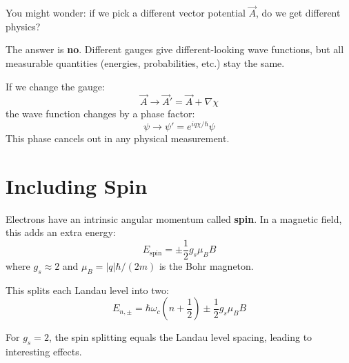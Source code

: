 \documentclass[11pt,a4paper]{article}
\let\oldsection\section
\renewcommand{\section}{\needspace{5\baselineskip}\oldsection}
\theoremstyle{definition}
\theoremstyle{remark}
\begin{document}
You might wonder: if we pick a different vector potential $\vec{A}$, do we get different physics?

The answer is \textbf{no}. Different gauges give different-looking wave functions, but all measurable quantities (energies, probabilities, etc.) stay the same.

If we change the gauge:
\begin{equation}
    \vec{A} \to \vec{A}' = \vec{A} + \nabla\chi
\end{equation}
the wave function changes by a phase factor:
\begin{equation}
    \psi \to \psi' = e^{iq\chi/\hbar} \psi
\end{equation}
This phase cancels out in any physical measurement.
\\
\section{Including Spin}

Electrons have an intrinsic angular momentum called \textbf{spin}. In a magnetic field, this adds an extra energy:
\begin{equation}
    E_{\text{spin}} = \pm \frac{1}{2}g_s\mu_B B
\end{equation}
where $g_s \approx 2$ and $\mu_B = |q|\hbar/(2m)$ is the Bohr magneton.

This splits each Landau level into two:
\begin{equation}
    E_{n, \pm} = \hbar\omega_c\left(n + \frac{1}{2}\right) \pm \frac{1}{2}g_s\mu_B B
\end{equation}

For $g_s = 2$, the spin splitting equals the Landau level spacing, leading to interesting effects.
\end{document}
